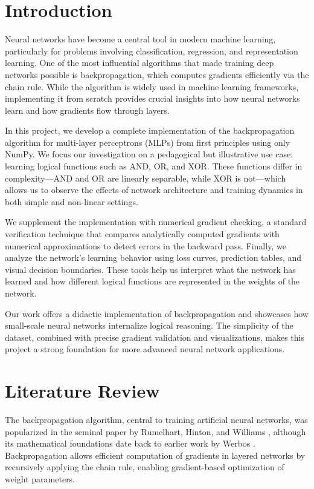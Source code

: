 \documentclass[11pt,a4paper]{article}
\begin{document}
\section{Introduction}
\label{sec:introduction}
Neural networks have become a central tool in modern machine learning, particularly for problems involving classification, regression, and representation learning. One of the most influential algorithms that made training deep networks possible is backpropagation, which computes gradients efficiently via the chain rule. While the algorithm is widely used in machine learning frameworks, implementing it from scratch provides crucial insights into how neural networks learn and how gradients flow through layers.

In this project, we develop a complete implementation of the backpropagation algorithm for multi-layer perceptrons (MLPs) from first principles using only NumPy. We focus our investigation on a pedagogical but illustrative use case: learning logical functions such as AND, OR, and XOR. These functions differ in complexity—AND and OR are linearly separable, while XOR is not—which allows us to observe the effects of network architecture and training dynamics in both simple and non-linear settings.

We supplement the implementation with numerical gradient checking, a standard verification technique that compares analytically computed gradients with numerical approximations to detect errors in the backward pass. Finally, we analyze the network’s learning behavior using loss curves, prediction tables, and visual decision boundaries. These tools help us interpret what the network has learned and how different logical functions are represented in the weights of the network.

Our work offers a didactic implementation of backpropagation and showcases how small-scale neural networks internalize logical reasoning. The simplicity of the dataset, combined with precise gradient validation and visualizations, makes this project a strong foundation for more advanced neural network applications.

\section{Literature Review}
The backpropagation algorithm, central to training artificial neural networks, was popularized in the seminal paper by Rumelhart, Hinton, and Williams \cite{rumelhart1986learning}, although its mathematical foundations date back to earlier work by Werbos \cite{werbos1974beyond}. Backpropagation allows efficient computation of gradients in layered networks by recursively applying the chain rule, enabling gradient-based optimization of weight parameters.
\end{document}
